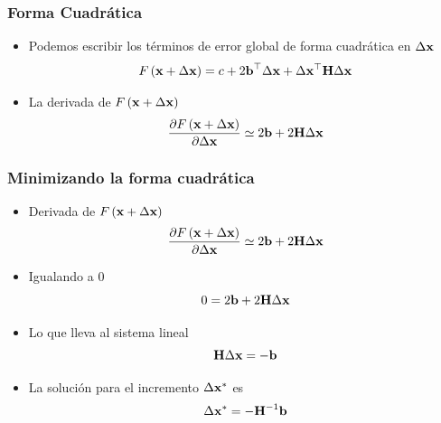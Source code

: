 \begin{frame}
    \frametitle{Forma Cuadrática}
    
    \begin{itemize}
        \item Podemos escribir los términos de error global de forma cuadrática en $\Delta \boldsymbol{\mathbf{x}}$
        \begin{equation*}
            F\left(\boldsymbol{\mathbf{x}} + \Delta \boldsymbol{\mathbf{x}} \right) = c + 2 \boldsymbol{\mathbf{b}}^{\top} \Delta \boldsymbol{\mathbf{x}} + \Delta \boldsymbol{\mathbf{x}}^{\top} \boldsymbol{\mathbf{H}} \Delta \boldsymbol{\mathbf{x}}
        \end{equation*}
        \item La derivada de $F\left(\boldsymbol{\mathbf{x}} + \Delta \boldsymbol{\mathbf{x}} \right)$
        \begin{equation*}
            \dfrac{\partial F\left(\boldsymbol{\mathbf{x}} + \Delta \boldsymbol{\mathbf{x}} \right)}{\partial \Delta \boldsymbol{\mathbf{x}}} \simeq 2 \boldsymbol{\mathbf{b}} + 2 \boldsymbol{\mathbf{H}} \Delta \boldsymbol{\mathbf{x}}
        \end{equation*}
    \end{itemize}
    
\end{frame}

\begin{frame}
    \frametitle{Minimizando la forma cuadrática}
    
    \begin{itemize}
        \item Derivada de $F\left(\boldsymbol{\mathbf{x}} + \Delta \boldsymbol{\mathbf{x}} \right)$
        \begin{equation*}
            \dfrac{\partial F\left(\boldsymbol{\mathbf{x}} + \Delta \boldsymbol{\mathbf{x}} \right)}{\partial \Delta \boldsymbol{\mathbf{x}}} \simeq 2 \boldsymbol{\mathbf{b}} + 2 \boldsymbol{\mathbf{H}} \Delta \boldsymbol{\mathbf{x}}
        \end{equation*}
        \item Igualando a 0
        \begin{equation*}
            0 = 2 \boldsymbol{\mathbf{b}} + 2 \boldsymbol{\mathbf{H}} \Delta \boldsymbol{\mathbf{x}}
        \end{equation*}
        \item Lo que lleva al sistema lineal
        \begin{equation*}
            \boldsymbol{\mathbf{H}} \Delta \boldsymbol{\mathbf{x}} = -\boldsymbol{\mathbf{b}} 
        \end{equation*}
        \item La solución para el incremento $\Delta \boldsymbol{\mathbf{x}}^{*}$ es
        \begin{equation*}
             \Delta \boldsymbol{\mathbf{x}}^{*} = - {\boldsymbol{\mathbf{H}}}^{-1} \boldsymbol{\mathbf{b}} 
        \end{equation*}
    \end{itemize}
    
\end{frame}

